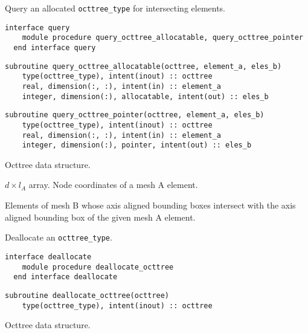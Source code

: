 \documentclass{article}
\begin{document}
\noindent Query an allocated \verb+octtree_type+ for intersecting elements.
  
\begin{lstlisting}[language=FORTRAN]
  interface query
    module procedure query_octtree_allocatable, query_octtree_pointer
  end interface query
\end{lstlisting}
    
\begin{lstlisting}[language=FORTRAN]
  subroutine query_octtree_allocatable(octtree, element_a, eles_b)
    type(octtree_type), intent(inout) :: octtree
    real, dimension(:, :), intent(in) :: element_a
    integer, dimension(:), allocatable, intent(out) :: eles_b
\end{lstlisting}
  
\begin{lstlisting}[language=FORTRAN]
  subroutine query_octtree_pointer(octtree, element_a, eles_b)
    type(octtree_type), intent(inout) :: octtree
    real, dimension(:, :), intent(in) :: element_a
    integer, dimension(:), pointer, intent(out) :: eles_b
\end{lstlisting}

\begin{description}[font=\ttfamily\bfseries,leftmargin=2.2\parindent,labelindent=1.7\parindent,noitemsep]
  \item[octtree] Octtree data structure.
  \item[element\_a] $d \times l_A$ array. Node coordinates of a mesh A element.
  \item[eles\_b] Elements of mesh B whose axis aligned bounding boxes intersect
    with the axis aligned bounding box of the given mesh A element.
\end{description}

\noindent Deallocate an \verb+octtree_type+.
  
\begin{lstlisting}[language=FORTRAN]
  interface deallocate
    module procedure deallocate_octtree
  end interface deallocate
\end{lstlisting}
  
\begin{lstlisting}[language=FORTRAN]
  subroutine deallocate_octtree(octtree)
    type(octtree_type), intent(inout) :: octtree
\end{lstlisting}

\begin{description}[font=\ttfamily\bfseries,leftmargin=2.2\parindent,labelindent=1.7\parindent,noitemsep]
  \item[octtree] Octtree data structure.
\end{description}
\end{document}
